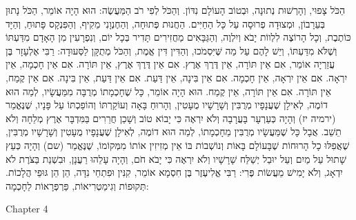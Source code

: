הַכֹּל צָפוּי, וְהָרְשׁוּת נְתוּנָה, וּבְטוֹב הָעוֹלָם נִדּוֹן. וְהַכֹּל לְפִי רֹב הַמַּעֲשֶׂה:
הוּא הָיָה אוֹמֵר, הַכֹּל נָתוּן בְּעֵרָבוֹן, וּמְצוּדָה פְרוּסָה עַל כָּל הַחַיִּים. הַחֲנוּת פְּתוּחָה, וְהַחֶנְוָנִי מֵקִיף, וְהַפִּנְקָס פָּתוּחַ, וְהַיָּד כּוֹתֶבֶת, וְכָל הָרוֹצֶה לִלְווֹת יָבֹא וְיִלְוֶה, וְהַגַּבָּאִים מַחֲזִירִים תָּדִיר בְּכָל יוֹם, וְנִפְרָעִין מִן הָאָדָם מִדַּעְתּוֹ וְשֶׁלֹּא מִדַּעְתּוֹ, וְיֵשׁ לָהֶם עַל מַה שֶּׁיִּסְמֹכוּ, וְהַדִּין דִּין אֱמֶת, וְהַכֹּל מְתֻקָּן לַסְּעוּדָה:
רַבִּי אֶלְעָזָר בֶּן עֲזַרְיָה אוֹמֵר, אִם אֵין תּוֹרָה, אֵין דֶּרֶךְ אֶרֶץ. אִם אֵין דֶּרֶךְ אֶרֶץ, אֵין תּוֹרָה. אִם אֵין חָכְמָה, אֵין יִרְאָה. אִם אֵין יִרְאָה, אֵין חָכְמָה. אִם אֵין בִּינָה, אֵין דַּעַת. אִם אֵין דַּעַת, אֵין בִּינָה. אִם אֵין קֶמַח, אֵין תּוֹרָה. אִם אֵין תּוֹרָה, אֵין קֶמַח. הוּא הָיָה אוֹמֵר, כָּל שֶׁחָכְמָתוֹ מְרֻבָּה מִמַּעֲשָׂיו, לְמַה הוּא דוֹמֶה, לְאִילָן שֶׁעֲנָפָיו מְרֻבִּין וְשָׁרָשָׁיו מֻעָטִין, וְהָרוּחַ בָּאָה וְעוֹקַרְתּוֹ וְהוֹפַכְתּוֹ עַל פָּנָיו, שֶׁנֶּאֱמַר (ירמיה יז) וְהָיָה כְּעַרְעָר בָּעֲרָבָה וְלֹא יִרְאֶה כִּי יָבוֹא טוֹב וְשָׁכַן חֲרֵרִים בַּמִּדְבָּר אֶרֶץ מְלֵחָה וְלֹא תֵשֵׁב. אֲבָל כָּל שֶׁמַּעֲשָׂיו מְרֻבִּין מֵחָכְמָתוֹ, לְמַה הוּא דוֹמֶה, לְאִילָן שֶׁעֲנָפָיו מֻעָטִין וְשָׁרָשָׁיו מְרֻבִּין, שֶׁאֲפִלּוּ כָל הָרוּחוֹת שֶׁבָּעוֹלָם בָּאוֹת וְנוֹשְׁבוֹת בּוֹ אֵין מְזִיזִין אוֹתוֹ מִמְּקוֹמוֹ, שֶׁנֶּאֱמַר (שם) וְהָיָה כְּעֵץ שָׁתוּל עַל מַיִם וְעַל יוּבַל יְשַׁלַּח שָׁרָשָׁיו וְלֹא יִרְאֶה כִּי יָבֹא חֹם, וְהָיָה עָלֵהוּ רַעֲנָן, וּבִשְׁנַת בַּצֹּרֶת לֹא יִדְאָג, וְלֹא יָמִישׁ מֵעֲשׂוֹת פֶּרִי:
רַבִּי אֱלִיעֶזֶר בֶּן חִסְמָא אוֹמֵר, קִנִּין וּפִתְחֵי נִדָּה, הֵן הֵן גּוּפֵי הֲלָכוֹת. תְּקוּפוֹת וְגִימַטְרִיאוֹת, פַּרְפְּרָאוֹת לַחָכְמָה:

Chapter 4

